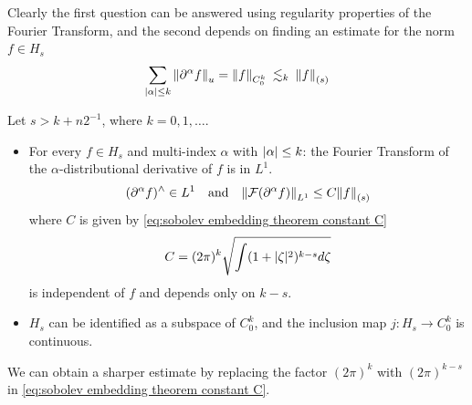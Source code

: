 \documentclass[../main-v2-manifolds.tex]{subfiles}
\begin{document}
Clearly the first question can be answered using regularity properties of the Fourier Transform, and the second depends on finding an estimate for the norm $f\in H_s$
\[
\sum_{\vert {\alpha} \vert\leq k} \norm{\partial^{\alpha} f}_u= \norm{f}_{C_0^k}\: \lesssim_{k}\: \norm{f}_{(s)}
\]
\begin{wts}\label{thm:Sobolev Embedding Theorem}
Let $s > k + n2^{-1}$, where $k = 0, 1,\ldots$.
\begin{itemize}
    \item For every $f\in H_s$ and multi-index $\alpha$ with $\vert {\alpha} \vert\leq k$: the Fourier Transform of the $\alpha$-distributional derivative of $f$ is in $L^1$.
    \[
    (\partial^\alpha f)^{\wedge}\in L^1\quad\text{and}\quad \norm{\mathcal{F}(\partial^\alpha f)}_{L^1}\leq C\norm{f}_{(s)}
    \]
    where $C$ is given by \cref{eq:sobolev embedding theorem constant C}
    \begin{equation}
        C=(2\pi)^k\sqrt{\int (1+\vert {\zeta} \vert^2)^{k-s}d\zeta}
        \label{eq:sobolev embedding theorem constant C}
    \end{equation}
    is independent of $f$ and depends only on $k-s$. 
    \item $H_s$ can be identified as a subspace of $C_0^k$, and the inclusion map $j: H_s\to C_0^k$ is continuous.
\end{itemize}
\end{wts}
\begin{remark}\label{rmk:sobolev embedding theorem sharper constant C}
    We can obtain a sharper estimate by replacing the factor $(2\pi)^k$ with $(2\pi)^{k-s}$ in \cref{eq:sobolev embedding theorem constant C}.
\end{remark}
\end{document}
